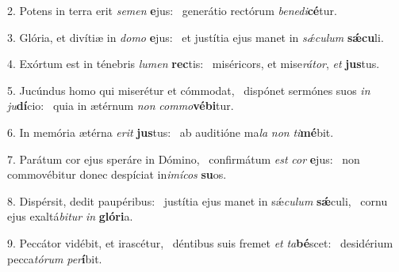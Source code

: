 2. Potens in terra erit \textit{se}\textit{men} \textbf{e}jus: \ast\  generátio rectórum \textit{be}\textit{ne}\textit{di}\textbf{cé}tur.\

3. Glória, et divítiæ in \textit{do}\textit{mo} \textbf{e}jus: \ast\  et justítia ejus manet in \textit{sǽ}\textit{cu}\textit{lum} \textbf{sǽ}\textbf{cu}li.\

4. Exórtum est in ténebris \textit{lu}\textit{men} \textbf{rec}tis: \ast\  miséricors, et mise\textit{rá}\textit{tor}, \textit{et} \textbf{jus}tus.\

5. Jucúndus homo qui miserétur et cómmodat, \dag\  dispónet sermónes suos \textit{in} \textit{ju}\textbf{dí}cio: \ast\  quia in ætérnum \textit{non} \textit{com}\textit{mo}\textbf{vé}\textbf{bi}tur.\

6. In memória ætérna \textit{e}\textit{rit} \textbf{jus}tus: \ast\  ab auditióne ma\textit{la} \textit{non} \textit{ti}\textbf{mé}bit.\

7. Parátum cor ejus speráre in Dómino, \dag\  confirmátum \textit{est} \textit{cor} \textbf{e}jus: \ast\  non commovébitur donec despíciat in\textit{i}\textit{mí}\textit{cos} \textbf{su}os.\

8. Dispérsit, dedit paupéribus: \dag\  justítia ejus manet in sǽ\textit{cu}\textit{lum} \textbf{sǽ}culi, \ast\  cornu ejus exaltá\textit{bi}\textit{tur} \textit{in} \textbf{gló}\textbf{ri}a.\

9. Peccátor vidébit, et irascétur, \dag\  déntibus suis fremet \textit{et} \textit{ta}\textbf{bé}scet: \ast\  desidérium pecca\textit{tó}\textit{rum} \textit{per}\textbf{í}bit.\

